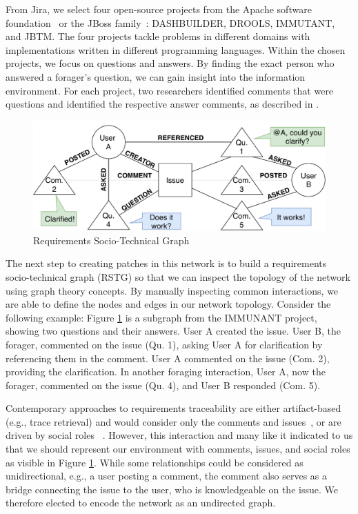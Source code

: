 \documentclass[conference]{IEEEtran}
\begin{document}
From Jira, we select four open-source projects from the Apache software foundation~\cite{ICSE7} or the JBoss family~\cite{ICSE38}: DASHBUILDER, DROOLS, IMMUTANT, and JBTM. The four projects tackle problems in different domains with implementations written in different programming languages. Within the chosen projects, we focus on questions and answers. By finding the exact person who answered a forager's question, we can gain insight into the information environment. For each project, two researchers identified comments that were questions and identified the respective answer comments, as described in \cite{ICSE2018}.

\begin{figure}
	\centering
	\includegraphics[width=\linewidth]{img/rstg.pdf}
	\caption{Requirements Socio-Technical Graph}
	\label{fig:rstg}
\end{figure}

The next step to creating patches in this network is to build a requirements socio-technical graph (RSTG) so that we can inspect the topology of the network using graph theory concepts. By manually inspecting common interactions, we are able to define the nodes and edges in our network topology. Consider the following example: Figure \ref{fig:rstg} is a subgraph from the IMMUNANT project, showing two questions and their answers. User A created the issue. User B, the forager, commented on the issue (Qu. 1), asking User A for clarification by referencing them in the comment. User A commented on the issue (Com. 2), providing the clarification. In another foraging interaction, User A, now the forager, commented on the issue (Qu. 4), and User B responded (Com. 5). 

Contemporary approaches to requirements traceability are either artifact-based (e.g., trace retrieval) and would consider only the comments and issues~\cite{ICSE15}, or are driven by social roles ~\cite{ICSE29}. However, this interaction and many like it indicated to us that we should represent our environment with comments, issues, and social roles as visible in Figure \ref{fig:rstg}. While some relationships could be considered as unidirectional, e.g., a user posting a comment, the comment also serves as a bridge connecting the issue to the user, who is knowledgeable on the issue. We therefore elected to encode the network as an undirected graph.
\end{document}

